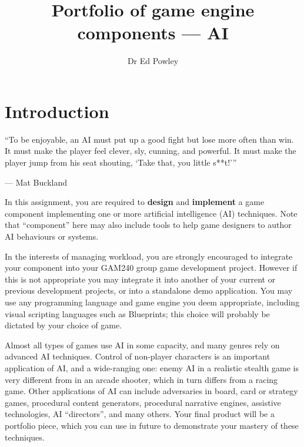 \documentclass{../../fal_assignment}
\title{Portfolio of game engine components --- AI}
\author{Dr Ed Powley}
\begin{document}
\maketitle

\section*{Introduction}

\begin{marginquote}
``To be enjoyable, an AI must put up a good fight but lose more often than win. It must make the player feel clever, sly, cunning, and powerful. It must make the player jump from his seat shouting, `Take that, you little s**t!'\thinspace''

--- Mat Buckland
\end{marginquote}

In this assignment, you are required to \textbf{design} and \textbf{implement} a game component
implementing one or more artificial intelligence (AI) techniques.
Note that ``component'' here may also include tools to help game designers to author AI behaviours or systems.

In the interests of managing workload, you are strongly encouraged to integrate your component into your GAM240 group game development project.
However if this is not appropriate you may integrate it into another of your current or previous development projects, or into a standalone demo application.
You may use any programming language and game engine you deem appropriate,
including visual scripting languages such as Blueprints;
this choice will probably be dictated by your choice of game.

Almost all types of games use AI in some capacity, and many genres rely on advanced AI techniques.
Control of non-player characters is an important application of AI,
and a wide-ranging one: enemy AI in a realistic stealth game is very different from in an arcade shooter,
which in turn differs from a racing game.
Other applications of AI can include adversaries in board, card or strategy games,
procedural content generators,
procedural narrative engines,
assistive technologies,
AI ``directors'',
and many others.
Your final product will be a portfolio piece, which you can use in future to demonstrate your mastery of these techniques.
\end{document}
